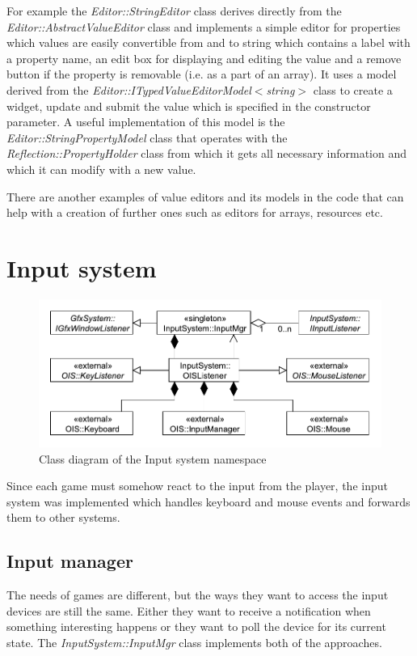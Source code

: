 \documentclass[a4paper, 12pt]{report}
\begin{document}
For example the \emph{Editor::StringEditor} class derives directly from the \emph{Editor::AbstractValueEditor} class and implements a simple editor for properties which values are easily convertible from and to string which contains a label with a property name, an edit box for displaying and editing the value and a remove button if the property is removable (i.e. as a part of an array). It uses a model derived from the \emph{Editor::ITypedValueEditorModel$<$string$>$} class to create a widget, update and submit the value which is specified in the constructor parameter. A useful implementation of this model is the \emph{Editor::StringPropertyModel} class that operates with the \emph{Reflection::Property\-Holder} class from which it gets all necessary information and which it can modify with a new value.

There are another examples of value editors and its models in the code that can help with a creation of further ones such as editors for arrays, resources etc.

\chapter{Input system}

\begin{figure}[htbp]
	\centering
		\includegraphics[width=1\textwidth]{InputSystemClassDiagram.pdf}
	\caption{Class diagram of the Input system namespace}
	\label{fig:inputsystem-diagram}
\end{figure}

Since each game must somehow react to the input from the player, the input system was implemented which handles keyboard and mouse events and forwards them to other systems.

\section{Input manager}
The needs of games are different, but the ways they want to access the input devices are still the same. Either they want to receive a notification when something interesting happens or they want to poll the device for its current state. The \emph{InputSystem::InputMgr} class implements both of the approaches.
\end{document}
